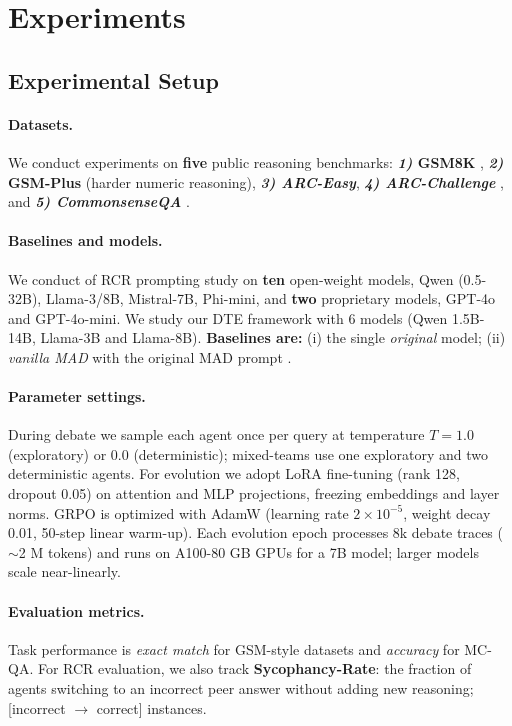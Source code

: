 \documentclass[11pt]{article}
\begin{document}
\section{Experiments}
\label{sec:exp}

\subsection{Experimental Setup}

\paragraph{Datasets.} We conduct experiments on \textbf{five} public reasoning benchmarks: \textbf{\textit{1)} GSM8K} \cite{cobbe2021trainingverifierssolvemath}, \textbf{\textit{2)} GSM-Plus} \cite{li2024gsmpluscomprehensivebenchmarkevaluating} (harder numeric reasoning), \textbf{\textit{3) ARC-Easy}}, \textbf{\textit{4) ARC-Challenge}} \citep{clark2018thinksolvedquestionanswering}, and \textbf{\textit{5) CommonsenseQA}} \citep{talmor-etal-2019-commonsenseqa}.

\paragraph{Baselines and models.}
We conduct of RCR prompting study on \textbf{ten} open-weight models, Qwen (0.5-32B), Llama-3/8B, Mistral-7B, Phi-mini, and \textbf{two} proprietary models, GPT-4o and GPT-4o-mini. We study our DTE framework with 6 models (Qwen 1.5B-14B, Llama-3B and Llama-8B). \textbf{Baselines are:} (i) the single \emph{original} model; (ii) \emph{vanilla MAD} with the original MAD prompt \cite{du2023improving}.

\paragraph{Parameter settings.} During debate we sample each agent once per query at temperature $T\!=\!1.0$ (exploratory) or $0.0$ (deterministic); mixed-teams use one exploratory and two deterministic agents. For evolution we adopt LoRA fine-tuning (rank 128, dropout 0.05) on attention and MLP projections, freezing embeddings and layer norms. GRPO is optimized with AdamW (learning rate $2{\times}10^{-5}$, weight decay 0.01, 50-step linear warm-up). Each evolution epoch processes 8k debate traces ($\sim$2 M tokens) and runs on A100-80 GB GPUs for a 7B model; larger models scale near-linearly.

\paragraph{Evaluation metrics.} Task performance is \emph{exact match} for GSM-style datasets and \emph{accuracy} for MC-QA. For RCR evaluation, we also track \textbf{Sycophancy-Rate}: the fraction of agents switching to an incorrect peer answer without adding new reasoning; [incorrect $\rightarrow$ correct] instances. 
\end{document}
